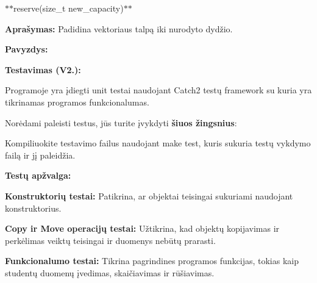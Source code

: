 \begin{DoxyItemize}
\begin{DoxyItemize}
\end{DoxyItemize}
\item \texorpdfstring{$\ast$}{*}\texorpdfstring{$\ast$}{*}{\ttfamily reserve(size\+\_\+t new\+\_\+capacity)}\texorpdfstring{$\ast$}{*}\texorpdfstring{$\ast$}{*}
\begin{DoxyItemize}
\item {\bfseries{Aprašymas\+:}} Padidina vektoriaus talpą iki nurodyto dydžio.
\item {\bfseries{Pavyzdys\+:}} 
\begin{DoxyCode}{0}

\end{DoxyCode}

\end{DoxyItemize}
\end{DoxyItemize}



{\bfseries{Testavimas (V2.)\+:}}

Programoje yra įdiegti unit testai naudojant Catch2 testų framework su kuria yra tikrinamas programos funkcionalumas.

Norėdami paleisti testus, jūs turite įvykdyti {\bfseries{šiuos žingsnius}}\+:


\begin{DoxyItemize}
\item Kompiliuokite testavimo failus naudojant {\ttfamily make test}, kuris sukuria testų vykdymo failą ir jį paleidžia.
\end{DoxyItemize}

{\bfseries{Testų apžvalga\+:}}


\begin{DoxyItemize}
\item {\bfseries{Konstruktorių testai\+:}} Patikrina, ar objektai teisingai sukuriami naudojant konstruktorius.
\item {\bfseries{Copy ir Move operacijų testai\+:}} Užtikrina, kad objektų kopijavimas ir perkėlimas veiktų teisingai ir duomenys nebūtų prarasti.
\item {\bfseries{Funkcionalumo testai\+:}} Tikrina pagrindines programos funkcijas, tokias kaip studentų duomenų įvedimas, skaičiavimas ir rūšiavimas.
\end{DoxyItemize}

